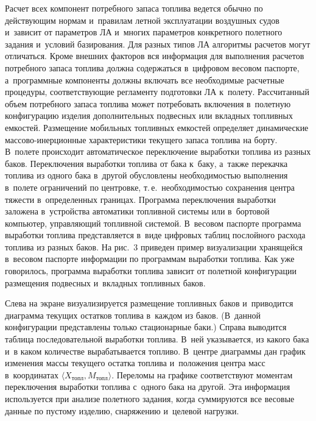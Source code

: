 \begin{multicols}{2}
  
  Расчет всех компонент потребного запаса топлива ведется обычно по 
действующим нормам и~правилам летной эксплуатации воздушных судов 
и~зависит от параметров ЛА и~многих параметров конкретного полетного задания 
и~условий базирования. Для разных типов ЛА алгоритмы расчетов могут 
отличаться. Кроме внешних факторов вся информация для выполнения 
расчетов потребного запаса топлива должна содержаться в~цифровом весовом 
паспорте, а~программные компоненты должны включать все необходимые 
расчетные процедуры, соответствующие регламенту подготовки ЛА к~полету. 
Рассчитанный объем потребного запаса топлива может потребовать включения в~полетную конфигурацию изделия дополнительных подвесных или вкладных 
топливных емкостей. Размещение мобильных топливных емкостей определяет 
динамические массово-инерционные характеристики текущего запаса топлива 
на борту. В~полете происходит автоматическое переключение выработки 
топлива из разных баков. Переключения выработки топлива от бака к~баку, 
а~также перекачка топлива из одного бака в~другой обусловлены 
необходимостью выполнения в~полете ограничений по центровке, т.\,е.\ 
необходимостью сохранения центра тяжести в~определенных границах. 
Программа переключения выработки заложена в~устройства автоматики 
топливной системы или в~бортовой компьютер, управляющий топливной 
системой. В~весовом паспорте программа выработки топлива пред\-став\-ля\-ет\-ся 
в~виде цифровых таблиц послойного расхода топлива из разных баков. На 
рис.~3 приведен пример визуализации хранящейся в~весовом паспорте 
информации по программам выработки топлива. Как уже говорилось, 
программа выработки топлива зависит от полетной конфигурации размещения 
подвесных и~вкладных топливных баков.
{ %

}
  

  Слева на экране визуализируется размещение топливных баков и~приводится 
диаграмма текущих остатков топлива в~каждом из баков. (В~данной 
конфигурации представлены только стационарные баки.) Справа выводится 
таблица последовательной выработки топлива. В~ней указывается, из какого 
бака и~в каком количестве вырабатывается топливо. В~цент\-ре диаграммы дан 
график изменения массы текущего остатка топлива и~положения центра масс 
в~координатах $\langle X_{\mathrm{топл}}, M_{\mathrm{топл}}\rangle$. 
Переломы на графике соответствуют моментам переключения выработки 
топлива с~одного бака на другой. Эта информация используется при анализе 
полетного задания, когда суммируются все весовые данные по пустому 
изделию, снаряжению и~целевой нагрузки.


\end{multicols}
